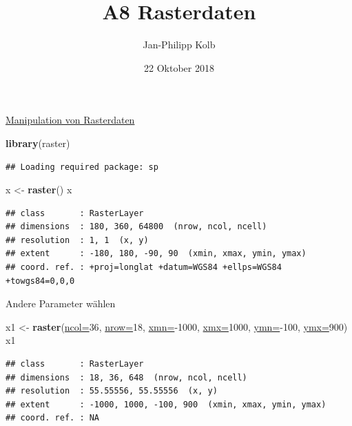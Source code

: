 \documentclass[ignorenonframetext,]{beamer}
\title{A8 Rasterdaten}
\author{Jan-Philipp Kolb}
\date{22 Oktober 2018}
\newenvironment{Shaded}{\begin{snugshade}}{\end{snugshade}}
\newcommand{\DataTypeTok}[1]{\textcolor[rgb]{0.74,0.68,0.62}{\underline{#1}}}
\newcommand{\DecValTok}[1]{\textcolor[rgb]{0.27,0.67,0.26}{#1}}
\newcommand{\KeywordTok}[1]{\textcolor[rgb]{0.26,0.66,0.93}{\textbf{#1}}}
\newcommand{\NormalTok}[1]{\textcolor[rgb]{0.74,0.68,0.62}{#1}}
\newcommand{\OperatorTok}[1]{\textcolor[rgb]{0.74,0.68,0.62}{#1}}
\newcommand{\StringTok}[1]{\textcolor[rgb]{0.02,0.61,0.04}{#1}}
\begin{document}
\frame{\titlepage}

\begin{frame}[fragile]{\href{http://rspatial.org/spatial/rst/8-rastermanip.html}{Manipulation
von Rasterdaten}}
\protect\hypertarget{manipulation-von-rasterdaten}{}

\begin{Shaded}
\begin{Highlighting}[]
\KeywordTok{library}\NormalTok{(raster)}
\end{Highlighting}
\end{Shaded}

\begin{verbatim}
## Loading required package: sp
\end{verbatim}

\begin{Shaded}
\begin{Highlighting}[]
\NormalTok{x <-}\StringTok{ }\KeywordTok{raster}\NormalTok{()}
\NormalTok{x}
\end{Highlighting}
\end{Shaded}

\begin{verbatim}
## class       : RasterLayer 
## dimensions  : 180, 360, 64800  (nrow, ncol, ncell)
## resolution  : 1, 1  (x, y)
## extent      : -180, 180, -90, 90  (xmin, xmax, ymin, ymax)
## coord. ref. : +proj=longlat +datum=WGS84 +ellps=WGS84 +towgs84=0,0,0
\end{verbatim}

\end{frame}

\begin{frame}[fragile]{Andere Parameter wählen}
\protect\hypertarget{andere-parameter-wahlen}{}

\begin{Shaded}
\begin{Highlighting}[]
\NormalTok{x1 <-}\StringTok{ }\KeywordTok{raster}\NormalTok{(}\DataTypeTok{ncol=}\DecValTok{36}\NormalTok{, }\DataTypeTok{nrow=}\DecValTok{18}\NormalTok{, }\DataTypeTok{xmn=}\OperatorTok{-}\DecValTok{1000}\NormalTok{, }\DataTypeTok{xmx=}\DecValTok{1000}\NormalTok{, }\DataTypeTok{ymn=}\OperatorTok{-}\DecValTok{100}\NormalTok{, }\DataTypeTok{ymx=}\DecValTok{900}\NormalTok{)}
\NormalTok{x1}
\end{Highlighting}
\end{Shaded}

\begin{verbatim}
## class       : RasterLayer 
## dimensions  : 18, 36, 648  (nrow, ncol, ncell)
## resolution  : 55.55556, 55.55556  (x, y)
## extent      : -1000, 1000, -100, 900  (xmin, xmax, ymin, ymax)
## coord. ref. : NA
\end{verbatim}

\end{frame}
\end{document}
